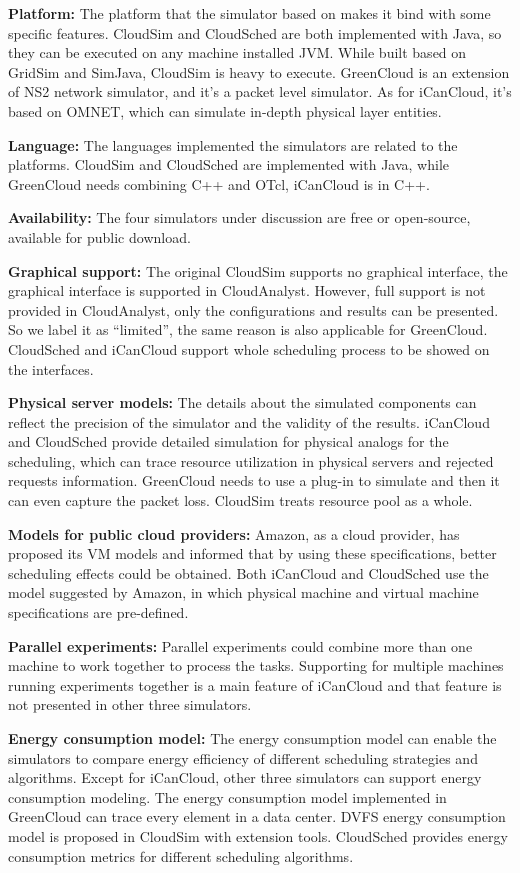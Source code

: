\documentclass[3p, twocolumn]{elsarticle}
\begin{document}
\textbf{Platform:} The platform that the simulator based on makes it bind with some specific features. CloudSim and CloudSched are both implemented with Java, so they can be executed on any machine installed JVM. While built based on GridSim and SimJava, CloudSim is heavy to execute.
GreenCloud is an extension of NS2 network simulator, and it's a packet level simulator. As for iCanCloud, it's based on OMNET, which can simulate in-depth physical layer entities.

\textbf{Language:} The languages implemented the simulators are related to the platforms. CloudSim and CloudSched are implemented with Java, while GreenCloud needs combining C++ and OTcl, iCanCloud is in C++.

\textbf{Availability:} The four simulators under discussion are free or open-source, available for public download.

\textbf{Graphical support:} The original CloudSim supports no graphical interface, the graphical interface is supported in CloudAnalyst. However, full support is not provided in CloudAnalyst, only the configurations and results can be presented. So we label it as “limited”, the same reason is also applicable for GreenCloud. CloudSched and iCanCloud support whole scheduling process to be showed on the interfaces.

\textbf{Physical server models:} The details about the simulated components can reflect the precision of the simulator and the validity of the results. iCanCloud and CloudSched provide detailed simulation for physical analogs for the scheduling, which can trace resource utilization in physical servers and rejected requests information. GreenCloud needs to use a plug-in to simulate and then it can even capture the packet loss. CloudSim treats resource pool as a whole.

\textbf{Models for public cloud providers:} Amazon, as a cloud provider, has proposed its VM models and informed that by using these specifications, better scheduling effects could be obtained. Both iCanCloud and CloudSched use the model suggested by Amazon, in which physical machine and virtual machine specifications are pre-defined.

\textbf{Parallel experiments:} Parallel experiments could combine more than one machine to work together to process the tasks. Supporting for multiple machines running experiments together is a main feature of iCanCloud and that feature is not presented in other three simulators.

\textbf{Energy consumption model:} The energy consumption model can enable the simulators to compare energy efficiency of different scheduling strategies and algorithms. Except for iCanCloud, other three simulators can support energy consumption modeling. The energy consumption model implemented in GreenCloud can trace every element in a data center. DVFS energy consumption model is proposed in CloudSim with extension tools. CloudSched provides energy consumption metrics for different scheduling algorithms.
\end{document}
